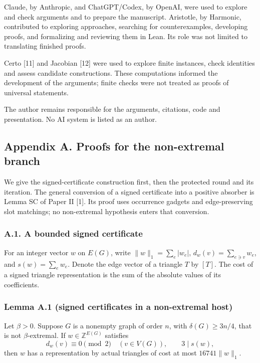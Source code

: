 \documentclass[english,11pt,a4paper]{article}
\newcounter{none}
\begin{document}
Claude, by Anthropic, and ChatGPT/Codex, by OpenAI, were used to explore and check arguments and to prepare the manuscript. Aristotle, by Harmonic, contributed to exploring approaches, searching for counterexamples, developing proofs, and formalizing and reviewing them in Lean. Its role was not limited to translating finished proofs.

Certo {[}11{]} and Jacobian {[}12{]} were used to explore finite instances, check identities and assess candidate constructions. These computations informed the development of the arguments; finite checks were not treated as proofs of universal statements.

The author remains responsible for the arguments, citations, code and presentation. No AI system is listed as an author.

\subsection{Appendix A. Proofs for the non-extremal branch}\label{appendix-a.-proofs-for-the-non-extremal-branch}

We give the signed-certificate construction first, then the protected round and its iteration. The general conversion of a signed certificate into a positive absorber is Lemma SC of Paper II {[}1{]}. Its proof uses occurrence gadgets and edge-preserving slot matchings; no non-extremal hypothesis enters that conversion.

\subsubsection{A.1. A bounded signed certificate}\label{a.1.-a-bounded-signed-certificate}

For an integer vector \(w\) on \(E(G)\), write \(\|w\|_1=\sum_e|w_e|\), \(d_w(v)=\sum_{e\ni v}w_e\), and \(s(w)=\sum_e w_e\). Denote the edge vector of a triangle \(T\) by \([T]\). The cost of a signed triangle representation is the sum of the absolute values of its coefficients.

\subsubsection{Lemma A.1 (signed certificates in a non-extremal host)}\label{lemma-a.1-signed-certificates-in-a-non-extremal-host}

Let \(\beta>0\). Suppose \(G\) is a nonempty graph of order \(n\), with \(\delta(G)\ge3n/4\), that is not \(\beta\)-extremal. If \(w\in\mathbb Z^{E(G)}\) satisfies \[d_w(v)\equiv0\pmod2\quad(v\in V(G)),\qquad 3\mid s(w),\] then \(w\) has a representation by actual triangles of cost at most \(16741\|w\|_1\).
\end{document}
